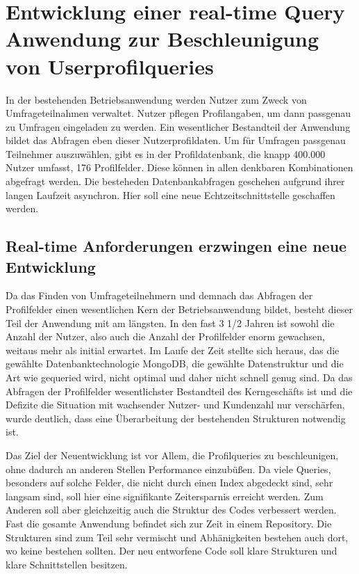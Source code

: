 \chapter{Entwicklung einer real-time Query Anwendung zur Beschleunigung von Userprofilqueries}
In der bestehenden Betriebsanwendung werden Nutzer zum Zweck von Umfrageteilnahmen verwaltet. Nutzer pflegen Profilangaben, um dann passgenau zu Umfragen eingeladen zu werden.
Ein wesentlicher Bestandteil der Anwendung bildet das Abfragen eben dieser Nutzerprofildaten. Um für Umfragen passgenau Teilnehmer auszuwählen, gibt es in der Profildatenbank, die knapp 400.000 Nutzer umfasst, 176 Profilfelder. Diese können in allen denkbaren Kombinationen abgefragt werden. Die besteheden Datenbankabfragen geschehen aufgrund ihrer langen Laufzeit asynchron. Hier soll eine neue Echtzeitschnittstelle geschaffen werden.

\section{Real-time Anforderungen erzwingen eine neue Entwicklung}
Da das Finden von Umfrageteilnehmern und demnach das Abfragen der Profilfelder einen wesentlichen Kern der Betriebsanwendung bildet, besteht dieser Teil der Anwendung mit am längsten. In den fast 3 1/2 Jahren ist sowohl die Anzahl der Nutzer, also auch die Anzahl der Profilfelder enorm gewachsen, weitaus mehr als initial erwartet. Im Laufe der Zeit stellte sich heraus, das die gewählte Datenbanktechnologie MongoDB, die gewählte Datenstruktur und die Art wie gequeried wird, nicht optimal und daher nicht schnell genug sind. Da das Abfragen der Profilfelder wesentlichster Bestandteil des Kerngeschäfts ist und die Defizite die Situation mit wachsender Nutzer- und Kundenzahl nur verschärfen, wurde deutlich, dass eine Überarbeitung der bestehenden Strukturen notwendig ist.

Das Ziel der Neuentwicklung ist vor Allem, die Profilqueries zu beschleunigen, ohne dadurch an anderen Stellen Performance einzubüßen. Da viele Queries, besonders auf solche Felder, die nicht durch einen Index abgedeckt sind, sehr langsam sind, soll hier eine signifikante Zeitersparnis erreicht werden. Zum Anderen soll aber gleichzeitig auch die Struktur des Codes verbessert werden. Fast die gesamte Anwendung befindet sich zur Zeit in einem Repository. Die Strukturen sind zum Teil sehr vermischt und Abhänigkeiten bestehen auch dort, wo keine bestehen sollten. Der neu entworfene Code soll klare Strukturen und klare Schnittstellen besitzen.

